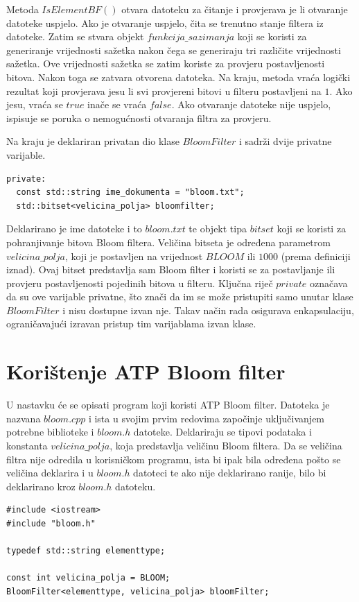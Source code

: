 \documentclass{foi}
\begin{document}
Metoda $IsElementBF()$ otvara datoteku za čitanje i provjerava je li otvaranje datoteke uspjelo. Ako je otvaranje uspjelo, čita se trenutno stanje filtera iz datoteke. Zatim se stvara objekt $funkcija\_sazimanja$ koji se koristi za generiranje vrijednosti sažetka nakon čega se generiraju tri različite vrijednosti sažetka. Ove vrijednosti sažetka se zatim koriste za provjeru postavljenosti bitova. Nakon toga se zatvara otvorena datoteka. Na kraju, metoda vraća logički rezultat koji provjerava jesu li svi provjereni bitovi u filteru postavljeni na $1$. Ako jesu, vraća se $true$ inače se vraća $false$. Ako otvaranje datoteke nije uspjelo, ispisuje se poruka o nemogućnosti otvaranja filtra za provjeru.

Na kraju je deklariran privatan dio klase $BloomFilter$ i sadrži dvije privatne varijable.

\begin{lstlisting}
private:
  const std::string ime_dokumenta = "bloom.txt";
  std::bitset<velicina_polja> bloomfilter;
\end{lstlisting}

Deklarirano je ime datoteke  i to $bloom.txt$ te objekt tipa $bitset$ koji se koristi za pohranjivanje bitova Bloom filtera. Veličina bitseta je određena parametrom $velicina\_polja$, koji je postavljen na vrijednost $BLOOM$ ili $1000$ (prema definiciji iznad). Ovaj bitset predstavlja sam Bloom filter i koristi se za postavljanje ili provjeru postavljenosti pojedinih bitova u filteru. Ključna riječ $private$ označava da su ove varijable privatne, što znači da im se može pristupiti samo unutar klase $BloomFilter$ i nisu dostupne izvan nje. Takav način rada osigurava enkapsulaciju, ograničavajući izravan pristup tim varijablama izvan klase.

\section{Korištenje ATP Bloom filter}
U nastavku će se opisati program koji koristi ATP Bloom filter. Datoteka je nazvana $bloom.cpp$ i ista u svojim prvim redovima započinje uključivanjem potrebne biblioteke i $bloom.h$ datoteke. Deklariraju se tipovi podataka i konstanta $velicina\_polja$, koja predstavlja veličinu Bloom filtera. Da se veličina filtra nije odredila u korisničkom programu, ista bi ipak bila određena pošto se veličina deklarira i u $bloom.h$ datoteci te ako nije deklarirano ranije, bilo bi deklarirano kroz $bloom.h$ datoteku.

\begin{lstlisting}
#include <iostream>
#include "bloom.h"
  
typedef std::string elementtype;
  
const int velicina_polja = BLOOM;
BloomFilter<elementtype, velicina_polja> bloomFilter;
\end{lstlisting}
\end{document}

